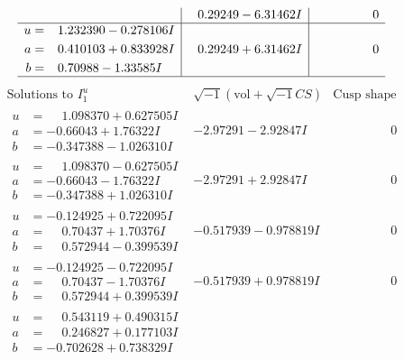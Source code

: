 \documentclass[1p]{elsarticle_modified}
\theoremstyle{definition}
\newcommand{\I}{\sqrt{-1}}
\begin{document}
$$\begin{array}{c|c|c}
 & \phantom{-}0.29249 - 6.31462 I & \phantom{-0.000000 } 0 \\ \hline\begin{aligned}
u &= \phantom{-}1.232390 - 0.278106 I \\
a &= \phantom{-}0.410103 + 0.833928 I \\
b &= \phantom{-}0.70988 - 1.33585 I\end{aligned}
 & \phantom{-}0.29249 + 6.31462 I & \phantom{-0.000000 } 0\\
 \hline 
 \end{array}$$\newpage$$\begin{array}{c|c|c}  
\text{Solutions to }I^u_{1}& \I (\text{vol} + \sqrt{-1}CS) & \text{Cusp shape}\\
 \hline 
\begin{aligned}
u &= \phantom{-}1.098370 + 0.627505 I \\
a &= -0.66043 + 1.76322 I \\
b &= -0.347388 - 1.026310 I\end{aligned}
 & -2.97291 - 2.92847 I & \phantom{-0.000000 } 0 \\ \hline\begin{aligned}
u &= \phantom{-}1.098370 - 0.627505 I \\
a &= -0.66043 - 1.76322 I \\
b &= -0.347388 + 1.026310 I\end{aligned}
 & -2.97291 + 2.92847 I & \phantom{-0.000000 } 0 \\ \hline\begin{aligned}
u &= -0.124925 + 0.722095 I \\
a &= \phantom{-}0.70437 + 1.70376 I \\
b &= \phantom{-}0.572944 - 0.399539 I\end{aligned}
 & -0.517939 - 0.978819 I & \phantom{-0.000000 } 0 \\ \hline\begin{aligned}
u &= -0.124925 - 0.722095 I \\
a &= \phantom{-}0.70437 - 1.70376 I \\
b &= \phantom{-}0.572944 + 0.399539 I\end{aligned}
 & -0.517939 + 0.978819 I & \phantom{-0.000000 } 0 \\ \hline\begin{aligned}
u &= \phantom{-}0.543119 + 0.490315 I \\
a &= \phantom{-}0.246827 + 0.177103 I \\
b &= -0.702628 + 0.738329 I\end{aligned}

\end{array}$$
\end{document}
